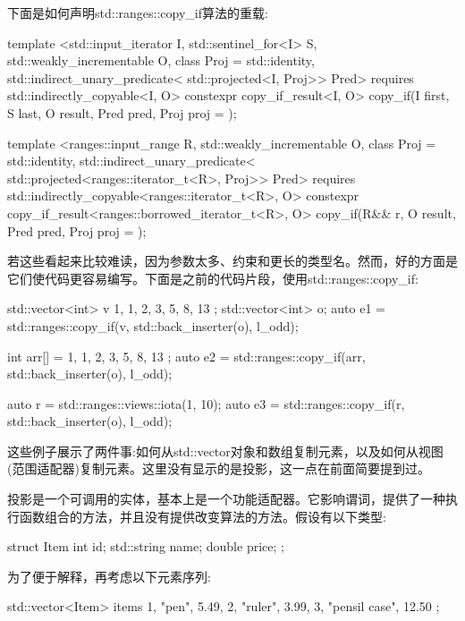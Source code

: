 下面是如何声明std::ranges::copy\_if算法的重载:

\begin{cpp}
template <std::input_iterator I,
		  std::sentinel_for<I> S,
		  std::weakly_incrementable O,
		  class Proj = std::identity,
		  std::indirect_unary_predicate<
		    std::projected<I, Proj>> Pred>
requires std::indirectly_copyable<I, O>
constexpr copy_if_result<I, O> copy_if(I first, S last,
									   O result,
								   	   Pred pred,
									   Proj proj = {} );
									   
template <ranges::input_range R,
		  std::weakly_incrementable O,
		  class Proj = std::identity,
		  std::indirect_unary_predicate<
		  std::projected<ranges::iterator_t<R>, Proj>> Pred>
requires std::indirectly_copyable<ranges::iterator_t<R>, O>
constexpr copy_if_result<ranges::borrowed_iterator_t<R>, O>
		  copy_if(R&& r,
				  O result,
				  Pred pred,
				  Proj proj = {});
\end{cpp}

若这些看起来比较难读，因为参数太多、约束和更长的类型名。然而，好的方面是它们使代码更容易编写。下面是之前的代码片段，使用std::ranges::copy\_if:

\begin{cpp}
std::vector<int> v{ 1, 1, 2, 3, 5, 8, 13 };
std::vector<int> o;
auto e1 = std::ranges::copy_if(v, std::back_inserter(o),
								l_odd);
								
int arr[] = { 1, 1, 2, 3, 5, 8, 13 };
auto e2 = std::ranges::copy_if(arr, std::back_inserter(o),
								l_odd);

auto r = std::ranges::views::iota(1, 10);
auto e3 = std::ranges::copy_if(r, std::back_inserter(o),
								l_odd);
\end{cpp}

这些例子展示了两件事:如何从std::vector对象和数组复制元素，以及如何从视图(范围适配器)复制元素。这里没有显示的是投影，这一点在前面简要提到过。

投影是一个可调用的实体，基本上是一个功能适配器。它影响谓词，提供了一种执行函数组合的方法，并且没有提供改变算法的方法。假设有以下类型:

\begin{cpp}
struct Item
{
	int id;
	std::string name;
	double price;
};
\end{cpp}

为了便于解释，再考虑以下元素序列:

\begin{cpp}
std::vector<Item> items{
	{1, "pen", 5.49},
	{2, "ruler", 3.99},
	{3, "pensil case", 12.50}
};
\end{cpp}

